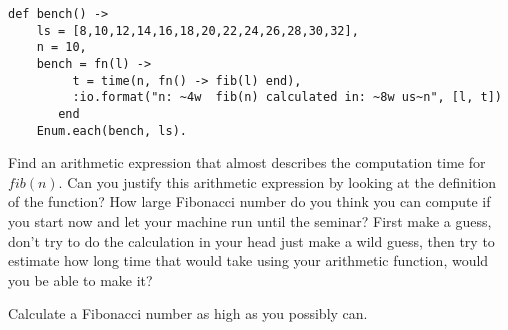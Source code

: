 \documentclass[a4paper,11pt]{article}
\begin{document}
\begin{verbatim}
def bench() ->
    ls = [8,10,12,14,16,18,20,22,24,26,28,30,32],
    n = 10,
    bench = fn(l) ->
         t = time(n, fn() -> fib(l) end),
         :io.format("n: ~4w  fib(n) calculated in: ~8w us~n", [l, t])
       end
    Enum.each(bench, ls).
\end{verbatim}

Find an arithmetic expression that almost describes the computation
time for $fib(n)$. Can you justify this arithmetic expression by
looking at the definition of the function?  How large Fibonacci number
do you think you can compute if you start now and let your machine run
until the seminar? First make a guess, don't try to do the calculation
in your head just make a wild guess, then try to estimate how long
time that would take using your arithmetic function, would you be able
to make it? 

Calculate a Fibonacci number as high as you possibly can.
\end{document}
